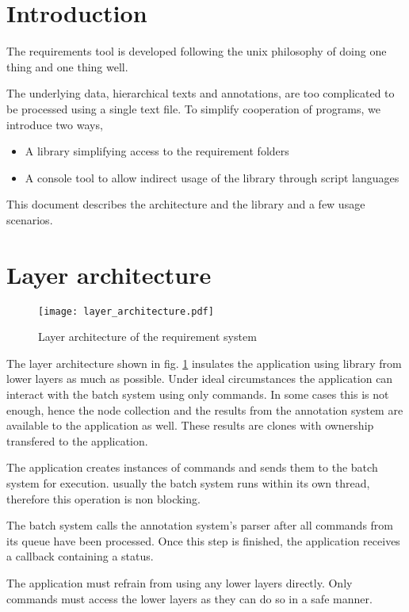 \documentclass[12pt]{article}
\begin{document}
\section{Introduction}
The requirements tool is developed following the unix philosophy of doing one thing and one thing well.

The underlying data, hierarchical texts and annotations, are too complicated to be processed using a single text file. To simplify cooperation of programs, we introduce two ways,
\begin{itemize}
\item A library simplifying access to the requirement folders
\item A console tool to allow indirect usage of the library through script languages
\end{itemize}

This document describes the architecture and the library and a few usage scenarios.

\section{Layer architecture}
\begin{figure}[!t]
\texttt{[image: layer\_architecture.pdf]}
\caption{Layer architecture of the requirement system}
\label{fig:layerarchitecture}
\end{figure}

The layer architecture shown in fig. \ref{fig:layerarchitecture} insulates the application using library from lower layers as much as possible.
Under ideal circumstances the application can interact with the batch system
using only commands. In some cases this is not enough, hence the node collection
and the results from the annotation system are available to the application as well. These results are clones with ownership transfered to the application.

The application creates instances of commands and sends them to the batch system for execution. usually the batch system runs within its own thread, therefore this operation is non blocking.

The batch system calls the annotation system's parser after all commands from its queue have been processed. Once this step is finished, the application receives a callback containing a status.

The application must refrain from using any lower layers directly. Only commands
must access the lower layers as they can do so in a safe manner.
\end{document}
